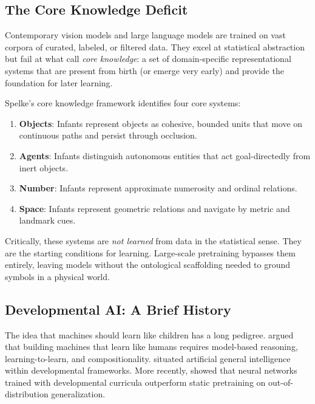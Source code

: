 \documentclass[11pt,oneside]{article}
\begin{document}
\subsection{The Core Knowledge Deficit}

Contemporary vision models \citep{dosovitskiy2020image} and large language models \citep{brown2020language} are trained on vast corpora of curated, labeled, or filtered data. They excel at statistical abstraction but fail at what \citet{spelke2007core} call \emph{core knowledge}: a set of domain-specific representational systems that are present from birth (or emerge very early) and provide the foundation for later learning.

Spelke's core knowledge framework identifies four core systems:
\begin{enumerate}
  \item \textbf{Objects}: Infants represent objects as cohesive, bounded units that move on continuous paths and persist through occlusion.
  \item \textbf{Agents}: Infants distinguish autonomous entities that act goal-directedly from inert objects.
  \item \textbf{Number}: Infants represent approximate numerosity and ordinal relations.
  \item \textbf{Space}: Infants represent geometric relations and navigate by metric and landmark cues.
\end{enumerate}

Critically, these systems are \emph{not learned} from data in the statistical sense. They are the starting conditions for learning. Large-scale pretraining bypasses them entirely, leaving models without the ontological scaffolding needed to ground symbols in a physical world.

\subsection{Developmental AI: A Brief History}

The idea that machines should learn like children has a long pedigree. \citet{lake2017building} argued that building machines that learn like humans requires model-based reasoning, learning-to-learn, and compositionality. \citet{boden2006mind} situated artificial general intelligence within developmental frameworks. More recently, \citet{smith2021developmental} showed that neural networks trained with developmental curricula outperform static pretraining on out-of-distribution generalization.
\end{document}
